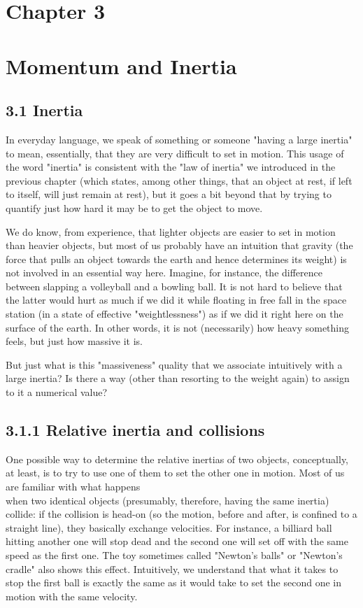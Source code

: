 \documentclass[10pt]{article}
\begin{document}
\section*{Chapter 3}
\section*{Momentum and Inertia}
\subsection*{3.1 Inertia}
In everyday language, we speak of something or someone "having a large inertia" to mean, essentially, that they are very difficult to set in motion. This usage of the word "inertia" is consistent with the "law of inertia" we introduced in the previous chapter (which states, among other things, that an object at rest, if left to itself, will just remain at rest), but it goes a bit beyond that by trying to quantify just how hard it may be to get the object to move.

We do know, from experience, that lighter objects are easier to set in motion than heavier objects, but most of us probably have an intuition that gravity (the force that pulls an object towards the earth and hence determines its weight) is not involved in an essential way here. Imagine, for instance, the difference between slapping a volleyball and a bowling ball. It is not hard to believe that the latter would hurt as much if we did it while floating in free fall in the space station (in a state of effective "weightlessness") as if we did it right here on the surface of the earth. In other words, it is not (necessarily) how heavy something feels, but just how massive it is.

But just what is this "massiveness" quality that we associate intuitively with a large inertia? Is there a way (other than resorting to the weight again) to assign to it a numerical value?

\subsection*{3.1.1 Relative inertia and collisions}
One possible way to determine the relative inertias of two objects, conceptually, at least, is to try to use one of them to set the other one in motion. Most of us are familiar with what happens\\
when two identical objects (presumably, therefore, having the same inertia) collide: if the collision is head-on (so the motion, before and after, is confined to a straight line), they basically exchange velocities. For instance, a billiard ball hitting another one will stop dead and the second one will set off with the same speed as the first one. The toy sometimes called "Newton's balls" or "Newton's cradle" also shows this effect. Intuitively, we understand that what it takes to stop the first ball is exactly the same as it would take to set the second one in motion with the same velocity.
\end{document}
